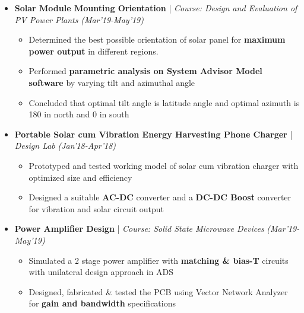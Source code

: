\documentclass[a4paper, 10pt]{article}
\newcommand{\isep}{-2 pt}
\begin{document}
\begin{itemize} \itemsep \isep 
\vspace{-0.01cm}
\item \textbf{\large Solar Module Mounting Orientation} | \textit{Course: Design and Evaluation of PV Power Plants} \hfill \emph{(Mar'19-May'19)} \\
    \vspace{2pt}
	\begin{itemize}\itemsep \isep
	\vspace{-0.70cm}
 \item Determined the best possible orientation of solar panel for \textbf{maximum power output} in different regions.
\item Performed \textbf{parametric analysis on System Advisor Model software} by varying tilt and azimuthal angle%
\item Concluded that optimal tilt angle is latitude angle and optimal azimuth is 180 in north and 0 in south
 	\end{itemize}
\vspace{-0.18cm}

\item \textbf{\large Portable Solar cum Vibration Energy Harvesting Phone Charger} |  \textit{Design Lab} \hfill \emph{(Jan'18-Apr'18)} \\
    \vspace{2pt}
\begin{itemize}\itemsep \isep
	\vspace{-0.70cm}
			\item Prototyped and tested working model of solar cum vibration charger with optimized size and efficiency
\item Designed a suitable \textbf{AC-DC} converter and a \textbf{DC-DC Boost} converter for vibration and solar circuit output
\end{itemize}
\vspace{-0.18cm}

\item \textbf{\large Power Amplifier Design} |  \textit{Course: Solid State Microwave Devices} \hfill \emph{(Mar'19-May'19)} \\
    \vspace{2pt}
	\begin{itemize}\itemsep \isep
	\vspace{-0.70cm}
		\item Simulated a 2 stage power amplifier with \textbf{matching \& bias-T} circuits with unilateral design approach in ADS 
	\item Designed, fabricated \& tested the PCB using Vector Network Analyzer for \textbf{gain and bandwidth} specifications
	\end{itemize}


\end{itemize}
\end{document}
